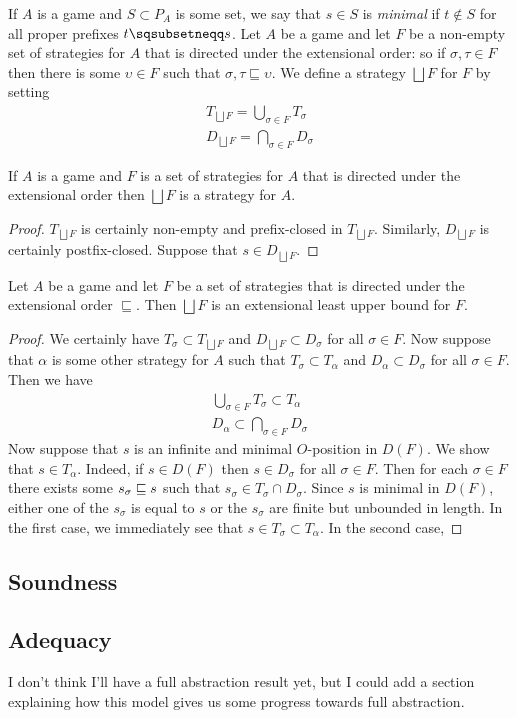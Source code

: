 \documentclass{article}
\newcommand{\exle}{\sqsubseteq}
\newcommand{\exlub}{\bigsqcup}
\begin{document}
If $A$ is a game and $S\subset P_A$ is some set, we say that $s\in S$ is \emph{minimal} if $t\not\in S$ for all proper prefixes $t\pprefix s$.  Let $A$ be a game and let $F$ be a non-empty set of strategies for $A$ that is directed under the extensional order: so if $\sigma,\tau\in F$ then there is some $\upsilon\in F$ such that $\sigma,\tau\exle\upsilon$.  We define a strategy $\exlub F$ for $F$ by setting
\begin{gather*}
  T_{\exlub F} = \bigcup_{\sigma\in F}T_\sigma \\
  D_{\exlub F} = \bigcap_{\sigma\in F}D_\sigma
\end{gather*}

\begin{proposition}
  If $A$ is a game and $F$ is a set of strategies for $A$ that is directed under the extensional order then $\exlub F$ is a strategy for $A$.
  \begin{proof}
    $T_{\exlub F}$ is certainly non-empty and prefix-closed in $T_{\exlub F}$.  Similarly, $D_{\exlub F}$ is certainly postfix-closed.  Suppose that $s\in D_{\exlub F}$.  
  \end{proof}
\end{proposition}

\begin{proposition}
  Let $A$ be a game and let $F$ be a set of strategies that is directed under the extensional order $\exle$.  Then $\exlub F$ is an extensional least upper bound for $F$.
  \begin{proof}
    We certainly have $T_\sigma\subset T_{\exlub F}$ and $D_{\exlub F}\subset D_\sigma$ for all $\sigma\in F$.  Now suppose that $\alpha$ is some other strategy for $A$ such that $T_\sigma\subset T_\alpha$ and $D_\alpha\subset D_\sigma$ for all $\sigma\in F$.  Then we have
    \begin{gather*}
      \bigcup_{\sigma\in F}T_\sigma\subset T_\alpha \\
      D_\alpha\subset \bigcap_{\sigma\in F} D_\sigma
    \end{gather*}
    Now suppose that $s$ is an infinite and minimal $O$-position in $D(F)$.  We show that $s\in T_\alpha$.  Indeed, if $s\in D(F)$ then $s\in D_\sigma$ for all $\sigma\in F$.  Then for each $\sigma\in F$ there exists some $s_\sigma\sqsubseteq s$ such that $s_\sigma\in T_\sigma\cap D_\sigma$.  Since $s$ is minimal in $D(F)$, either one of the $s_\sigma$ is equal to $s$ or the $s_\sigma$ are finite but unbounded in length.  In the first case, we immediately see that $s\in T_\sigma\subset T_\alpha$.  In the second case, 
  \end{proof}
\end{proposition}

\subsection{Soundness}

\subsection{Adequacy}

I don't think I'll have a full abstraction result yet, but I could add a section explaining how this model gives us some progress towards full abstraction.  



\end{document}
